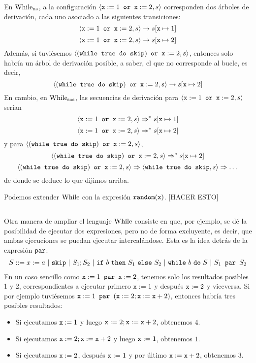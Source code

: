En $\mathrm{While}_{\mathrm{ns}}$, a la configuración $\langle \texttt{x}:= 1 \texttt{ or } \texttt{x}:=2, s \rangle$ corresponden dos árboles de derivación, cada uno asociado a las siguientes transiciones:
$$\langle \texttt{x}:= 1 \texttt{ or } \texttt{x}:=2, s \rangle \to s[\texttt{x}\mapsto 1]$$
$$\langle \texttt{x}:= 1 \texttt{ or } \texttt{x}:=2, s \rangle \to s[\texttt{x}\mapsto 2]$$
Además, si tuviésemos $\langle (\texttt{while true do skip}) \texttt{ or } \texttt{x}:=2, s \rangle$, entonces solo habría un árbol de derivación posible, a saber, el que no corresponde al bucle, es decir, 
$$\langle (\texttt{while true do skip}) \texttt{ or } \texttt{x}:=2, s \rangle \to s[\texttt{x}\mapsto 2]$$
En cambio, en $\mathrm{While}_{\mathrm{sos}}$, las secuencias de derivación para $\langle \texttt{x}:= 1 \texttt{ or } \texttt{x}:=2, s \rangle$ serían
$$\langle \texttt{x}:= 1 \texttt{ or } \texttt{x}:=2, s \rangle \Rightarrow^* s[\texttt{x}\mapsto 1]$$
$$\langle \texttt{x}:= 1 \texttt{ or } \texttt{x}:=2, s \rangle \Rightarrow^* s[\texttt{x}\mapsto 2]$$
y para $\langle (\texttt{while true do skip}) \texttt{ or } \texttt{x}:=2, s \rangle$, 
$$\langle (\texttt{while true do skip}) \texttt{ or } \texttt{x}:=2, s \rangle \Rightarrow^* s[\texttt{x}\mapsto 2]$$
$$\langle (\texttt{while true do skip}) \texttt{ or } \texttt{x}:=2, s \rangle \Rightarrow \langle \texttt{while true do skip}, s \rangle \Rightarrow\dots$$
de donde se deduce lo que dijimos arriba.

\begin{example}
Podemos extender $\mathrm{While}$ con la expresión $\texttt{random}(\texttt{x})$. [HACER ESTO] 
\end{example}

\subsection{}

Otra manera de ampliar el lenguaje $\mathrm{While}$ consiste en que, por ejemplo, se dé la posibilidad de ejecutar dos expresiones, pero no de forma excluyente, es decir, que ambas ejecuciones se puedan ejecutar intercalándose. Esta es la idea detrás de la expresión $\texttt{par}$:
\[
    \begin{array}{l}
         S ::= x:=a\ |\ \n{skip}\ |\ S_1;S_2\ |\ \n{if}\ b\ \n{then}\ S_1\ \n{else}\ S_2\ |\ \n{while}\ b\ \n{do}\ S \ | \ S_1 \n{ par } S_2
    \end{array}
\]
En un caso sencillo como $\texttt{x}:= 1 \texttt{ par } \texttt{x}:=2$, tenemos solo los resultados posibles 1 y 2, correspondientes a ejecutar primero $\texttt{x}:= 1$ y después $\texttt{x}:=2$ y viceversa. Si por ejemplo tuviésemos $\texttt{x}:= 1 \texttt{ par } (\texttt{x}:=2; \texttt{x}:=\texttt{x} + 2)$, entonces habría tres posibles resultados:
\begin{itemize}
    \item Si ejecutamos $\texttt{x}:=1$ y luego $\texttt{x}:=2; \texttt{x}:= \texttt{x}+2$, obtenemos $4$.
    \item Si ejecutamos $\texttt{x}:=2; \texttt{x}:= \texttt{x}+2$ y luego $\texttt{x}:=1$, obtenemos $1$.
    \item Si ejecutamos $\texttt{x}:=2$, después $\texttt{x}:=1$ y por último $\texttt{x}:= \texttt{x}+2$, obtenemos 3.
\end{itemize}

